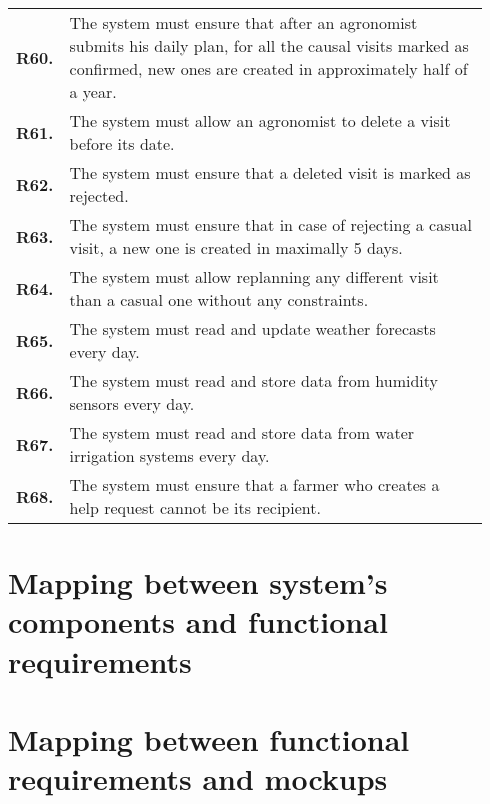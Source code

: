 \begin{longtable}{@{}p{0.06\linewidth} p{0.88\linewidth}}
	\textbf{R60.} & The system must ensure that after an agronomist submits his daily plan, for all the causal visits marked as confirmed, new ones are created in approximately half of a year.\\
	\textbf{R61.} & The system must allow an agronomist to delete a visit before its date.\\
	\textbf{R62.} & The system must ensure that a deleted visit is marked as rejected.\\
	\textbf{R63.} & The system must ensure that in case of rejecting a casual visit, a new one is created in maximally 5 days.\\
	\textbf{R64.} & The system must allow replanning any different visit than a casual one without any constraints.\\
	
	\textbf{R65.} & The system must read and update weather forecasts every day. \\
	\textbf{R66.} & The system must read and store data from humidity sensors every day. \\
	\textbf{R67.} & The system must read and store data from water irrigation systems every day. \\
	\textbf{R68.} & The system must ensure that a farmer who creates a help request cannot be its recipient.\\
		
	\bottomrule
\end{longtable}

\section{Mapping between system's components and functional requirements}


\section{Mapping between functional requirements and mockups}

